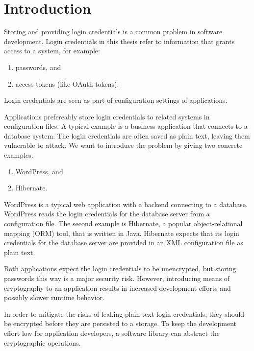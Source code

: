 \chapter{Introduction}
\label{intro}

Storing and providing login credentials is a common problem in software development.
Login credentials in this thesis refer to information that grants access to a system, for example:

\begin{enumerate}
\item passwords, and
\item access tokens (like OAuth tokens).
\end{enumerate}

Login credentials are seen as part of configuration settings of applications.

Applications prefereably store login credentials to related systems in configuration files.
A typical example is a business application that connects to a database system.
The login credentials are often saved as plain text, leaving them vulnerable to attack.
We want to introduce the problem by giving two concrete examples:

\begin{enumerate}
\item WordPress, and
\item Hibernate.
\end{enumerate}

WordPress is a typical web application with a backend connecting to a database.
WordPress reads the login credentials for the database server from a configuration file.\cite{wordpress-doc}
The second example is Hibernate, a popular object-relational mapping (ORM) tool, that is written in Java.
Hibernate expects that its login credentials for the database server are provided in an XML configuration file as plain text.\cite{hibernate-doc}

Both applications expect the login credentials to be unencrypted, but storing passwords this way is a major security risk.
However, introducing means of cryptography to an application results in increased development efforts and possibly slower runtime behavior.

\label{intro-hypo-one}

In order to mitigate the risks of leaking plain text login credentials, they should be encrypted before they are persisted to a storage.
To keep the development effort low for application developers, a software library can abstract the cryptographic operations.

